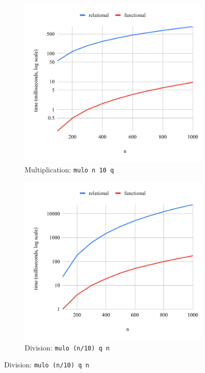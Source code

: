 \begin{figure}[h]
  \centering
    \begin{subfigure}[b]{0.49\textwidth}
      \includegraphics[width=\textwidth]{fig/muloIIO.pdf}
    \caption{Multiplication: \lstinline{mulo n 10 q}}
    \label{fig:mulo_IIO}
  \end{subfigure}
\hfill
    \begin{subfigure}[b]{0.49\textwidth}
      \includegraphics[width=1\textwidth]{fig/muloIOI.pdf}
    \caption{Division: \lstinline{mulo (n/10) q n}}
    \label{fig:mulo_IOI}
  \end{subfigure}


\end{figure}

